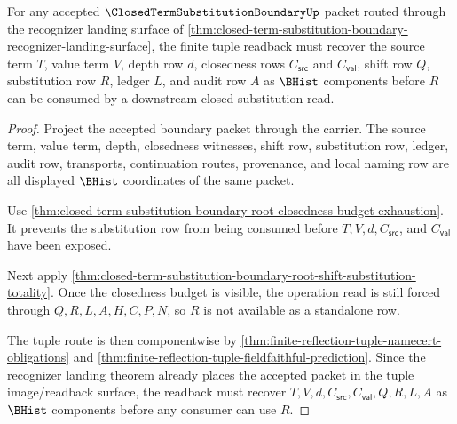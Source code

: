 \begin{theorem}
\label{thm:closed-term-substitution-boundary-finite-tuple-readback}
For any accepted $\ClosedTermSubstitutionBoundaryUp$ packet routed through the recognizer landing surface of \autoref{thm:closed-term-substitution-boundary-recognizer-landing-surface}, the finite tuple readback must recover the source term $T$, value term $V$, depth row $d$, closedness rows $C_{\mathsf{src}}$ and $C_{\mathsf{val}}$, shift row $Q$, substitution row $R$, ledger $L$, and audit row $A$ as $\BHist$ components before $R$ can be consumed by a downstream closed-substitution read.
\end{theorem}
\begin{proof}
Project the accepted boundary packet through the carrier. The source term, value term, depth, closedness witnesses, shift row, substitution row, ledger, audit row, transports, continuation routes, provenance, and local naming row are all displayed $\BHist$ coordinates of the same packet.

Use \autoref{thm:closed-term-substitution-boundary-root-closedness-budget-exhaustion}. It prevents the substitution row from being consumed before $T,V,d,C_{\mathsf{src}}$, and $C_{\mathsf{val}}$ have been exposed.

Next apply \autoref{thm:closed-term-substitution-boundary-root-shift-substitution-totality}. Once the closedness budget is visible, the operation read is still forced through $Q,R,L,A,H,C,P,N$, so $R$ is not available as a standalone row.

The tuple route is then componentwise by \autoref{thm:finite-reflection-tuple-namecert-obligations} and \autoref{thm:finite-reflection-tuple-fieldfaithful-prediction}. Since the recognizer landing theorem already places the accepted packet in the tuple image/readback surface, the readback must recover $T,V,d,C_{\mathsf{src}},C_{\mathsf{val}},Q,R,L,A$ as $\BHist$ components before any consumer can use $R$.
\end{proof}

